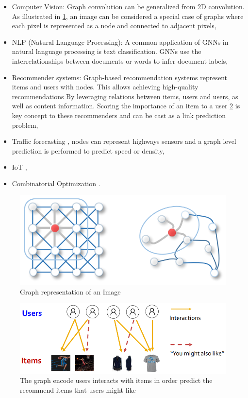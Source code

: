 \begin{itemize}
    
    \item Computer Vision: Graph convolution can be generalized from 2D convolution. As illustrated in \ref{fig:cv_gnn}, an image can be considered a special case of graphs where each pixel is represented as a node and connected to adjacent pixels,
    \item NLP (Natural Language Processing): A common application of GNNs in natural language processing is text classification. GNNs use the interrelationships between documents or words to infer document labels,
    \item Recommender systems: Graph-based recommendation systems represent items and users with nodes. This allows achieving high-quality recommendations By leveraging  relations between items, users and users, as well as content information. Scoring the importance of an item to a user \ref{fig:recom_sis_img} is key concept to these recommenders and can be cast as a link prediction problem,
    \item Traffic forecasting \cite{gapp2}, nodes can represent highways sensors and a graph level prediction is performed to predict speed or density,
    \item IoT \cite{iot} \cite{gapp3},
    \item Combinatorial Optimization \cite{peng}.
\end{itemize}

\begin{figure}
    \centering
    \includegraphics[scale=0.4]{figures/cv_gnn.png}
    \captionsetup{font=large}
    \caption{Graph representation of an Image}
    \label{fig:cv_gnn}
\end{figure}

\begin{figure}
    \centering
    \includegraphics[scale=0.5]{figures/recom_sis_img.png}
    \captionsetup{font=large}
    \caption{The graph encode users interacts with items in order predict the recommend items that users might like}
    \label{fig:recom_sis_img}
\end{figure}

